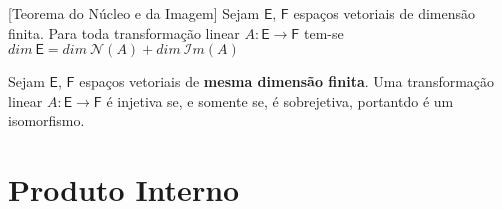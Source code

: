 \documentclass[10pt,a4paper]{article}
\begin{document}
\begin{theorem}[Teorema do Núcleo e da Imagem]
	Sejam $\textsf{E}$, $\textsf{F}$ espaços vetoriais de dimensão finita. Para toda transformação linear $A:\textsf{E} \rightarrow \textsf{F}$ tem-se $dim\ \textsf{E} = dim\ \mathcal{N}(A) + dim\ \mathcal{I}m(A)$
\end{theorem}

\begin{corollary}
	Sejam $\textsf{E}$, $\textsf{F}$ espaços vetoriais de \textbf{mesma dimensão finita}. Uma transformação linear $A:\textsf{E} \rightarrow \textsf{F}$ é injetiva se, e somente se, é sobrejetiva, portantdo é um isomorfismo.
\end{corollary}

\section{Produto Interno}
\end{document}
